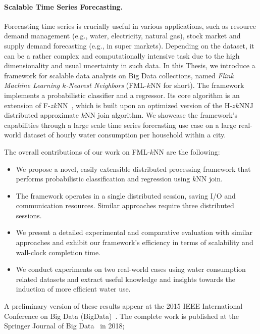 \paragraph{Scalable Time Series Forecasting.} Forecasting time series is crucially useful in various applications, such as resource demand management (e.g., water, electricity, natural gas), stock market and supply demand forecasting (e.g., in super markets). Depending on the dataset, it can be a rather complex and computationally intensive task due to the high dimensionality and usual uncertainty in such data. In this Thesis, we introduce a framework for scalable data analysis on Big Data collections, named \textit{Flink Machine Learning $k$-Nearest Neighbors} (FML-$k$NN for short). The framework implements a probabilistic classifier and a regressor. Its core algorithm is an extension of F-$zk$NN~\cite{chatzigeorgakidis2015mapreduce}, which is built upon an optimized version of the H-$zk$NNJ~\cite{zhang2012epk} distributed approximate $k$NN join algorithm. We showcase the framework's capabilities through a large scale time series forecasting use case on a large real-world dataset of hourly water consumption per household within a city.

The overall contributions of our work on FML-$k$NN are the following:
\begin{itemize}
	\item We propose a novel, easily extensible distributed processing framework that performs probabilistic classification and regression using $k$NN join.
	\item The framework operates in a single distributed session, saving I/O and communication resources. Similar approaches require three distributed sessions.
	\item We present a detailed experimental and comparative evaluation with similar approaches and exhibit our framework's efficiency in terms of scalability and wall-clock completion time.
	\item We conduct experiments on two real-world cases using water consumption related datasets and extract useful knowledge and insights towards the induction of more efficient water use.
\end{itemize}

A preliminary version of these results appear at the 2015 IEEE International Conference on Big Data (BigData)~\cite{chatzigeorgakidis2015mapreduce}. The complete work is published at the Springer Journal of Big Data~\cite{chatzigeorgakidis2018fml} in 2018; 

